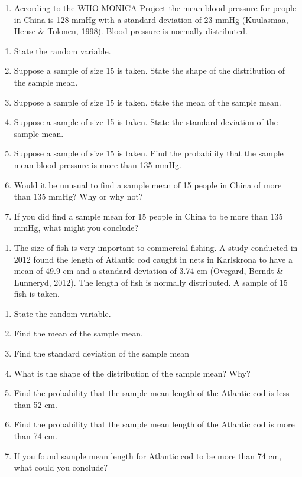 \documentclass[
]{book}
\providecommand{\tightlist}{%
  \setlength{\itemsep}{0pt}\setlength{\parskip}{0pt}}
\begin{document}
\begin{enumerate}
\def\labelenumi{\arabic{enumi}.}
\setcounter{enumi}{3}
\tightlist
\item
  According to the WHO MONICA Project the mean blood pressure for people in China is 128 mmHg with a standard deviation of 23 mmHg (Kuulasmaa, Hense \& Tolonen, 1998). Blood pressure is normally distributed.
\end{enumerate}

\begin{enumerate}
\def\labelenumi{\alph{enumi}.}
\tightlist
\item
  State the random variable.
\item
  Suppose a sample of size 15 is taken. State the shape of the distribution of the sample mean.
\item
  Suppose a sample of size 15 is taken. State the mean of the sample mean.
\item
  Suppose a sample of size 15 is taken. State the standard deviation of the sample mean.
\item
  Suppose a sample of size 15 is taken. Find the probability that the sample mean blood pressure is more than 135 mmHg.
\item
  Would it be unusual to find a sample mean of 15 people in China of more than 135 mmHg? Why or why not?
\item
  If you did find a sample mean for 15 people in China to be more than 135 mmHg, what might you conclude?
\end{enumerate}

\begin{enumerate}
\def\labelenumi{\arabic{enumi}.}
\setcounter{enumi}{4}
\tightlist
\item
  The size of fish is very important to commercial fishing. A study conducted in 2012 found the length of Atlantic cod caught in nets in Karlskrona to have a mean of 49.9 cm and a standard deviation of 3.74 cm (Ovegard, Berndt \& Lunneryd, 2012). The length of fish is normally distributed. A sample of 15 fish is taken.
\end{enumerate}

\begin{enumerate}
\def\labelenumi{\alph{enumi}.}
\tightlist
\item
  State the random variable.
\item
  Find the mean of the sample mean.
\item
  Find the standard deviation of the sample mean
\item
  What is the shape of the distribution of the sample mean? Why?
\item
  Find the probability that the sample mean length of the Atlantic cod is less than 52 cm.
\item
  Find the probability that the sample mean length of the Atlantic cod is more than 74 cm.
\item
  If you found sample mean length for Atlantic cod to be more than 74 cm, what could you conclude?
\end{enumerate}
\end{document}
